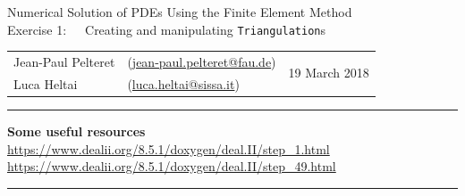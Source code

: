 \documentclass[11pt]{exam}
\makeatletter
\newcommand{\makeheader}[3]{%
\setcounter{question}{0}
\begin{center}
{\sc Numerical Solution of PDEs Using the Finite Element Method}\vspace{2ex}\\
{\sc Exercise #1:\ \ \ #2}\vspace{2ex}\\
\begin{tabular*}{\textwidth}{ll @{\extracolsep{\fill}}r}
Jean-Paul Pelteret & (\url{jean-paul.pelteret@fau.de}) & \multirow{2}{*}{#3} \\
Luca Heltai & (\url{luca.heltai@sissa.it}) & \\
\end{tabular*}
\end{center}
}
\newcommand{\makeresources}[1]{%
\rule{\textwidth}{0.6mm}
\textbf{Some useful resources}\\[1.5ex]
#1 \par
\rule{\textwidth}{0.6mm}
}
\makeatother
\begin{document}
%
%




\clearpage
\makeheader{1}{Creating and manipulating \texttt{Triangulation}s}{19 March 2018}
\makeresources{%
\url{https://www.dealii.org/8.5.1/doxygen/deal.II/step_1.html} \\
\url{https://www.dealii.org/8.5.1/doxygen/deal.II/step_49.html}
}
\end{document}
